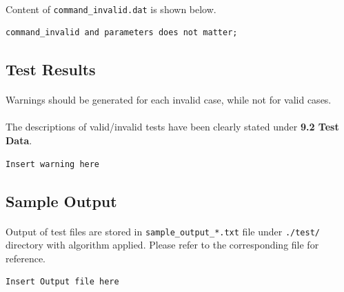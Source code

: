\documentclass{article}
\begin{document}
            \paragraph{}
                Content of \texttt{command\_invalid.dat} is shown below.
            \begin{Verbatim}[gobble=8]
                command_invalid and parameters does not matter;
            \end{Verbatim}
        \subsection{Test Results}
            \paragraph{}
                Warnings should be generated for each invalid case, while not for valid cases. 
            \paragraph{}
                The descriptions of valid/invalid tests have been clearly stated under
                \textbf{9.2 Test Data}.
            \begin{Verbatim}[gobble=8]
                Insert warning here
            \end{Verbatim}
        \subsection{Sample Output}
            \paragraph{}
                Output of test files are stored in \texttt{sample\_output\_*.txt} file under
                \texttt{./test/} directory with algorithm applied. Please refer to the
                corresponding file for reference.
            \begin{Verbatim}[gobble=8]
                Insert Output file here
            \end{Verbatim}
\end{document}
